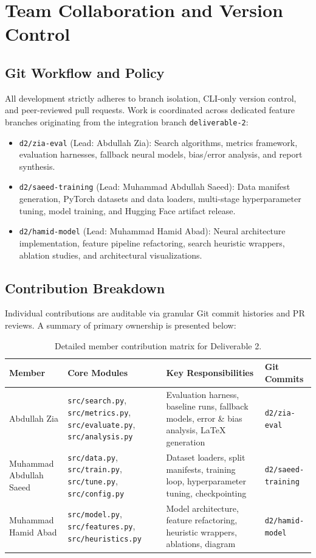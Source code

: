 
\section{Team Collaboration and Version Control}

\subsection{Git Workflow and Policy}
All development strictly adheres to branch isolation, CLI-only version control, and peer-reviewed
pull requests. Work is coordinated across dedicated feature branches originating from the integration
branch \texttt{deliverable-2}:
\begin{itemize}
    \item \texttt{d2/zia-eval} (Lead: Abdullah Zia): Search algorithms, metrics framework, evaluation harnesses, fallback neural models, bias/error analysis, and report synthesis.
    \item \texttt{d2/saeed-training} (Lead: Muhammad Abdullah Saeed): Data manifest generation, PyTorch datasets and data loaders, multi-stage hyperparameter tuning, model training, and Hugging Face artifact release.
    \item \texttt{d2/hamid-model} (Lead: Muhammad Hamid Abad): Neural architecture implementation, feature pipeline refactoring, search heuristic wrappers, ablation studies, and architectural visualizations.
\end{itemize}

\subsection{Contribution Breakdown}
Individual contributions are auditable via granular Git commit histories and PR reviews.
A summary of primary ownership is presented below:

\begin{table}[H]
\centering
\small
\begin{tabular}{lp{4.2cm}p{4.2cm}l}
\toprule
\textbf{Member} & \textbf{Core Modules} & \textbf{Key Responsibilities} & \textbf{Git Commits} \\
\midrule
Abdullah Zia & \texttt{src/search.py}, \texttt{src/metrics.py}, \texttt{src/evaluate.py}, \texttt{src/analysis.py} & Evaluation harness, baseline runs, fallback models, error \& bias analysis, LaTeX generation & \texttt{d2/zia-eval} \\
Muhammad Abdullah Saeed & \texttt{src/data.py}, \texttt{src/train.py}, \texttt{src/tune.py}, \texttt{src/config.py} & Dataset loaders, split manifests, training loop, hyperparameter tuning, checkpointing & \texttt{d2/saeed-training} \\
Muhammad Hamid Abad & \texttt{src/model.py}, \texttt{src/features.py}, \texttt{src/heuristics.py} & Model architecture, feature refactoring, heuristic wrappers, ablations, diagram & \texttt{d2/hamid-model} \\
\bottomrule
\end{tabular}
\caption{Detailed member contribution matrix for Deliverable 2.}
\label{tab:contributions}
\end{table}
